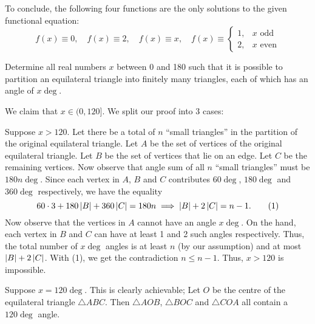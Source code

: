 To conclude, the following four functions are the only solutions to the given functional equation: \[f(x) \equiv 0, \quad f(x) \equiv 2, \quad f(x) \equiv x, \quad f(x) \equiv \begin{cases}
    1, &\text{$x$ odd}\\
    2, &\text{$x$ even}
\end{cases}\]

\begin{question}[$x \in {(0, 120]}$]\label{A::2023-O-2-5}
    Determine all real numbers $x$ between 0 and 180 such that it is possible to partition an equilateral triangle into finitely many triangles, each of which has an angle of $x\deg$.
\end{question}


 We claim that $x \in (0, 120]$. We split our proof into 3 cases:

 Suppose $x > 120$. Let there be a total of $n$ ``small triangles'' in the partition of the original equilateral triangle. Let $A$ be the set of vertices of the original equilateral triangle. Let $B$ be the set of vertices that lie on an edge. Let $C$ be the remaining vertices. Now observe that angle sum of all $n$ ``small triangles'' must be $180n\deg$. Since each vertex in $A$, $B$ and $C$ contributes $60\deg$, $180\deg$ and $360\deg$ respectively, we have the equality \[60\cdot3 + 180\left\lvert B \right\rvert + 360\left\lvert C \right\rvert = 180n \implies  \left\lvert B \right\rvert + 2\left\lvert C \right\rvert = n-1. \tag{1}\] Now observe that the vertices in $A$ cannot have an angle $x\deg$. On the hand, each vertex in $B$ and $C$ can have at least 1 and 2 such angles respectively. Thus, the total number of $x\deg$ angles is at least $n$ (by our assumption) and at most $\left\lvert B \right\rvert + 2\left\lvert C \right\rvert$. With (1), we get the contradiction $n \leq n-1$. Thus, $x > 120$ is impossible.

 Suppose $x = 120\deg$. This is clearly achievable; Let $O$ be the centre of the equilateral triangle $\triangle ABC$. Then $\triangle AOB$, $\triangle BOC$ and $\triangle COA$ all contain a $120\deg$ angle.

